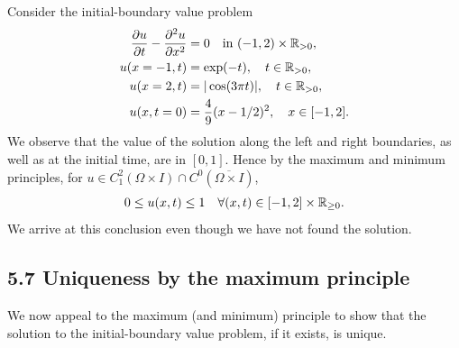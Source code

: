 \begin{example}
    Consider the initial-boundary value problem
    \begin{align*}
        \frac{\partial u}{\partial t} - \frac{\partial^2 u}{\partial x^2} &= 0 \quad \text{in } (-1, 2) \times \mathbb{R}_{>0}, \\
        u(x = -1, t) &= \exp(-t), \quad t \in \mathbb{R}_{>0}, \\
        u(x = 2, t) &= |\cos(3\pi t)|, \quad t \in \mathbb{R}_{>0}, \\
        u(x, t = 0) &= \frac{4}{9}(x - 1/2)^2, \quad x \in [-1, 2].
    \end{align*}
    We observe that the value of the solution along the left and right boundaries, as well as at the initial time, are in $[0, 1]$. Hence by the maximum and minimum principles, for $u \in C_1^2(\Omega \times I) \cap C^0(\overline{\Omega \times I})$,
    \[0 \leq u(x, t) \leq 1 \quad \forall (x, t) \in [-1, 2] \times \mathbb{R}_{\geq 0}.\]
    We arrive at this conclusion even though we have not found the solution.
\end{example}

\subsection{5.7 Uniqueness by the maximum principle}
We now appeal to the maximum (and minimum) principle to show that the solution to the initial-boundary value problem, if it exists, is unique.


